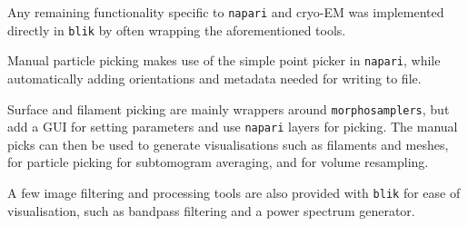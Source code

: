 Any remaining functionality specific to \texttt{napari} and cryo-EM was implemented directly in \texttt{blik} by often wrapping the aforementioned tools.

Manual particle picking makes use of the simple point picker in \texttt{napari}, while automatically adding orientations and metadata needed for writing to file.

Surface and filament picking are mainly wrappers around \texttt{morphosamplers}, but add a GUI for setting parameters and use \texttt{napari} layers for picking. The manual picks can then be used to generate visualisations such as filaments and meshes, for particle picking for subtomogram averaging, and for volume resampling.

A few image filtering and processing tools are also provided with \texttt{blik} for ease of visualisation, such as bandpass filtering and a power spectrum generator.
